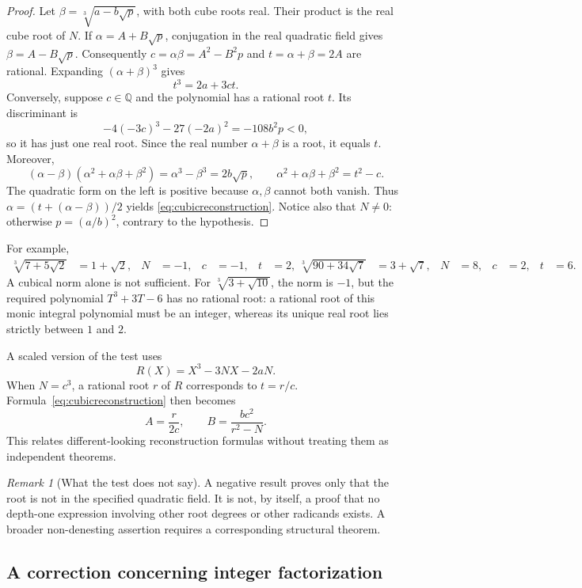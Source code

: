 \documentclass[11pt,a4paper]{article}
\newcommand{\Q}{\mathbb{Q}}
\newcommand{\cbrt}[1]{\sqrt[3]{#1}}
\theoremstyle{definition}
\theoremstyle{remark}
\newtheorem{remark}[theorem]{Remark}
\numberwithin{equation}{section}
\begin{document}
\begin{proof}
Let $\beta=\cbrt{a-b\sqrt p}$, with both cube roots real. Their product is the real cube root of $N$. If $\alpha=A+B\sqrt p$, conjugation in the real quadratic field gives $\beta=A-B\sqrt p$. Consequently $c=\alpha\beta=A^2-B^2p$ and $t=\alpha+\beta=2A$ are rational. Expanding $(\alpha+\beta)^3$ gives
\[
 t^3=2a+3ct.
\]
Conversely, suppose $c\in\Q$ and the polynomial has a rational root $t$. Its discriminant is
\[
 -4(-3c)^3-27(-2a)^2=-108b^2p<0,
\]
so it has just one real root. Since the real number $\alpha+\beta$ is a root, it equals $t$. Moreover,
\[
 (\alpha-\beta)(\alpha^2+\alpha\beta+\beta^2)
 =\alpha^3-\beta^3=2b\sqrt p,
 \qquad
 \alpha^2+\alpha\beta+\beta^2=t^2-c.
\]
The quadratic form on the left is positive because $\alpha,\beta$ cannot both vanish. Thus $\alpha=(t+(\alpha-\beta))/2$ yields \eqref{eq:cubicreconstruction}. Notice also that $N\ne0$: otherwise $p=(a/b)^2$, contrary to the hypothesis.
\end{proof}

For example,
\begin{align}
 \cbrt{7+5\sqrt2}&=1+\sqrt2,
   &N&=-1,&c&=-1,&t&=2,\
 \cbrt{90+34\sqrt7}&=3+\sqrt7,
   &N&=8,&c&=2,&t&=6.
\end{align}
A cubical norm alone is not sufficient. For $\cbrt{3+\sqrt{10}}$, the norm is $-1$, but the required polynomial $T^3+3T-6$ has no rational root: a rational root of this monic integral polynomial must be an integer, whereas its unique real root lies strictly between $1$ and $2$.

A scaled version of the test uses
\[
 R(X)=X^3-3NX-2aN.
\]
When $N=c^3$, a rational root $r$ of $R$ corresponds to $t=r/c$. Formula~\eqref{eq:cubicreconstruction} then becomes
\[
 A=\frac{r}{2c},\qquad B=\frac{bc^2}{r^2-N}.
\]
This relates different-looking reconstruction formulas without treating them as independent theorems.

\begin{remark}[What the test does not say]
A negative result proves only that the root is not in the specified quadratic field. It is not, by itself, a proof that no depth-one expression involving other root degrees or other radicands exists. A broader non-denesting assertion requires a corresponding structural theorem.
\end{remark}

\subsection{A correction concerning integer factorization}
\end{document}
